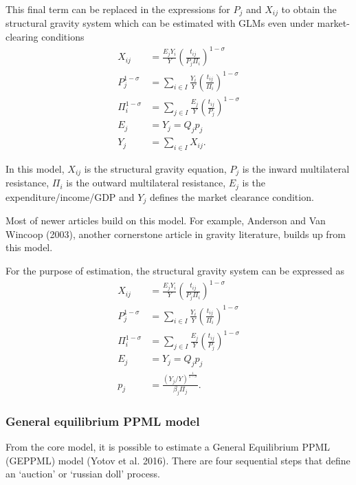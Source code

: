\documentclass[12pt,reqno,oneside,pdftex]{formato-puc/puctesis} %
\begin{document}
This final term can be replaced in the expressions for \(P_j\) and
\(X_{ij}\) to obtain the structural gravity system which can be
estimated with GLMs even under market-clearing conditions \begin{align*}
X_{ij} &= \frac{E_j Y_i}{Y} \left( \frac{t_{ij}}{P_j \Pi_i} \right)^{1 - \sigma} \\
P_j^{1 - \sigma} &= \sum_{i \in I} \frac{Y_i}{Y} \left( \frac{t_{ij}}{\Pi_i} \right)^{1 - \sigma} \\
\Pi_i^{1 - \sigma} &= \sum_{j \in I} \frac{E_j}{Y} \left( \frac{t_{ij}}{P_j} \right)^{1 - \sigma} \\
E_j &= Y_j = Q_j p_j \\
Y_j &= \sum_{i \in I} X_{ij}.
\end{align*}

In this model, \(X_{ij}\) is the structural gravity equation, \(P_j\) is
the inward multilateral resistance, \(\Pi_i\) is the outward
multilateral resistance, \(E_j\) is the expenditure/income/GDP and
\(Y_j\) defines the market clearance condition.

Most of newer articles build on this model. For example, Anderson and
Van Wincoop (2003), another cornerstone article in gravity literature,
builds up from this model.

For the purpose of estimation, the structural gravity system can be
expressed as \begin{align*}
X_{ij} &= \frac{E_j Y_i}{Y} \left( \frac{t_{ij}}{P_j \Pi_i} \right)^{1 - \sigma} \label{eq:1}\\
P_j^{1 - \sigma} &= \sum_{i \in I} \frac{Y_i}{Y} \left( \frac{t_{ij}}{\Pi_i} \right)^{1 - \sigma} \\
\Pi_i^{1 - \sigma} &= \sum_{j \in I} \frac{E_j}{Y} \left( \frac{t_{ij}}{P_j} \right)^{1 - \sigma} \\
E_j &= Y_j = Q_j p_j \\
p_j &= \frac{(Y_j / Y)^{\frac{1}{1 - \sigma}}}{\beta_j \Pi_j}.
\end{align*}

\hypertarget{general-equilibrium-ppml-model}{%
\subsubsection{General equilibrium PPML
model}\label{general-equilibrium-ppml-model}}

From the core model, it is possible to estimate a General Equilibrium
PPML (GEPPML) model (Yotov et al. 2016). There are four sequential steps
that define an `auction' or `russian doll' process.
\end{document}
